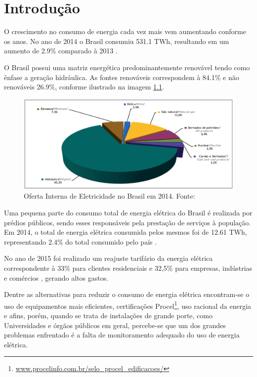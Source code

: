 \chapter{Introdução}
O crescimento no consumo de energia cada vez mais vem aumentando conforme os anos. No
ano de 2014 o Brasil consumiu 531.1 TWh, resultando em um aumento de 2.9\% comparado à 2013 \cite{balanco_energetico}.

O Brasil possui uma matriz energética predominantemente renovável tendo como ênfase a geração hidráulica. As fontes renováveis correspondem à 84.1\% e não renováveis 26.9\%, conforme ilustrado na imagem \ref{consumo-2014}.

\begin{figure}[h]
    \centering
    \includegraphics[keepaspectratio=true,scale=0.4]{figuras/consumo_energia_2014.eps}
    \caption{Oferta Interna de Eletricidade no Brasil em 2014. Fonte: \cite{balanco_energetico}}
    \label{consumo-2014}
\end{figure}

Uma pequena parte do consumo total de energia elétrica do Brasil é realizada por prédios públicos, sendo
esses responsáveis pela prestação de serviços à população. Em 2014, o total de energia elétrica consumida
pelos mesmos foi de 12.61 TWh, representando 2.4\% do total consumido pelo país \cite{balanco_energetico}.

No ano de 2015 foi realizado um reajuste tarifário da energia elétrica correspondente à 33\% para clientes residenciais e 32,5\% para empresas, indústrias e comércios \cite{aumento_energia}, gerando altos gastos.

Dentre as alternativas para reduzir o consumo de energia elétrica encontram-se o uso de equipamentos mais eficientes, certificações Procel\footnote{\url{www.procelinfo.com.br/selo_procel_edificacoes/}}, uso racional da energia e afins, porém, quando se trata de instalações de grande porte, como Universidades e órgãos públicos em geral, percebe-se que um dos grandes problemas enfrentado é a falta de monitoramento adequado do uso de energia elétrica.

